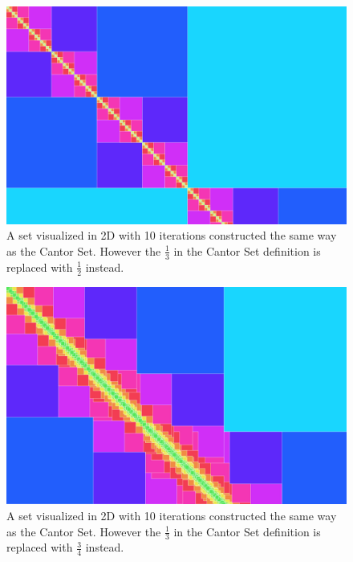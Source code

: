 \documentclass[11pt]{ekblite}
\begin{document}
	\begin{figure}[h]
		\includegraphics[scale=0.2]{img/c8.jpg}
		\caption{A set visualized in 2D with 10 iterations constructed the same way as the Cantor Set. However the $\frac{1}{3}$ in the Cantor Set definition is replaced with $\frac{1}{2}$ instead.}
	\end{figure}
	\begin{figure}[h]
		\includegraphics[scale=0.2]{img/c7.jpg}
		\caption{A set visualized in 2D with 10 iterations constructed the same way as the Cantor Set. However the $\frac{1}{3}$ in the Cantor Set definition is replaced with $\frac{3}{4}$ instead.}
	\end{figure}
\end{document}
